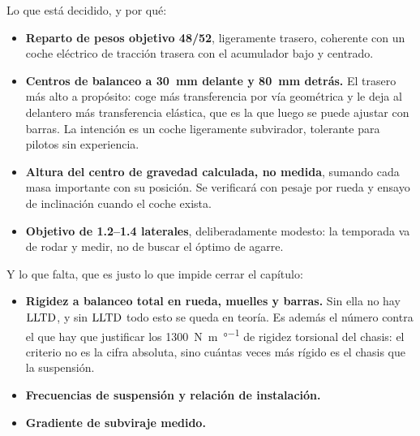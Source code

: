 \begin{caso}
Lo que está decidido, y por qué:

\begin{itemize}
  \item \textbf{Reparto de pesos objetivo \num{48}/\num{52}}, ligeramente
        trasero, coherente con un coche eléctrico de tracción trasera con el
        acumulador bajo y centrado.
  \item \textbf{Centros de balanceo a \SI{30}{\milli\meter} delante y
        \SI{80}{\milli\meter} detrás.} El trasero más alto a propósito: coge
        más transferencia por vía geométrica y le deja al delantero más
        transferencia elástica, que es la que luego se puede ajustar con
        barras. La intención es un coche ligeramente subvirador, tolerante para
        pilotos sin experiencia.
  \item \textbf{Altura del centro de gravedad calculada, no medida}, sumando
        cada masa importante con su posición. Se verificará con pesaje por
        rueda y ensayo de inclinación cuando el coche exista.
  \item \textbf{Objetivo de \SIrange{1.2}{1.4}{\gacc} laterales}, deliberadamente
        modesto: la temporada va de rodar y medir, no de buscar el óptimo de
        agarre.
\end{itemize}

Y lo que falta, que es justo lo que impide cerrar el capítulo:

\begin{itemize}
  \item \textbf{Rigidez a balanceo total en rueda, muelles y barras.} Sin ella
        no hay $\mathrm{LLTD}$, y sin $\mathrm{LLTD}$ todo esto se queda en teoría. Es además
        el número contra el que hay que justificar los
        \SI{1300}{\newton\meter\per\degree} de rigidez torsional del chasis: el
        criterio no es la cifra absoluta, sino cuántas veces más rígido es el
        chasis que la suspensión.

  \item \textbf{Frecuencias de suspensión y relación de instalación.}

  \item \textbf{Gradiente de subviraje medido.}

\end{itemize}
\end{caso}

